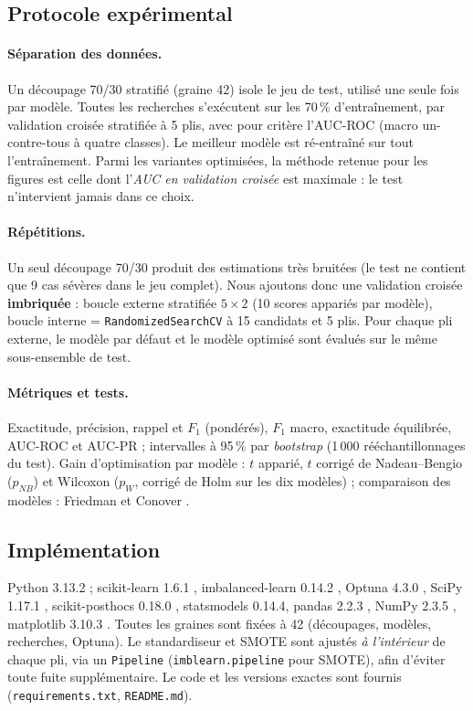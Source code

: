 \subsection{Protocole expérimental}\label{sec:proto}
\paragraph{Séparation des données.} Un découpage 70/30 stratifié (graine 42) isole le jeu de test, utilisé une seule fois par modèle. Toutes les recherches s'exécutent sur les 70\,\% d'entraînement, par validation croisée stratifiée à 5 plis, avec pour critère l'AUC-ROC (macro un-contre-tous à quatre classes). Le meilleur modèle est ré-entraîné sur tout l'entraînement. Parmi les variantes optimisées, la méthode retenue pour les figures est celle dont l'\emph{AUC en validation croisée} est maximale : le test n'intervient jamais dans ce choix.

\paragraph{Répétitions.} Un seul découpage 70/30 produit des estimations très bruitées (le test ne contient que 9 cas sévères dans le jeu complet). Nous ajoutons donc une validation croisée \textbf{imbriquée} : boucle externe stratifiée $5\times2$ (10 scores appariés par modèle), boucle interne = \texttt{RandomizedSearchCV} à 15 candidats et 5 plis. Pour chaque pli externe, le modèle par défaut et le modèle optimisé sont évalués sur le même sous-ensemble de test.

\paragraph{Métriques et tests.} Exactitude, précision, rappel et $F_1$ (pondérés), $F_1$ macro, exactitude équilibrée, AUC-ROC et AUC-PR ; intervalles à 95\,\% par \emph{bootstrap} (1\,000 rééchantillonnages du test). Gain d'optimisation par modèle : $t$ apparié, $t$ corrigé de Nadeau--Bengio ($p_{NB}$) et Wilcoxon ($p_W$, corrigé de Holm sur les dix modèles) ; comparaison des modèles : Friedman et Conover \cite{demsar2006,terpilowski2019}.

\subsection{Implémentation}\label{sec:impl}
Python 3.13.2 ; scikit-learn 1.6.1 \cite{pedregosa2011}, imbalanced-learn 0.14.2 \cite{lemaitre2017}, Optuna 4.3.0 \cite{akiba2019}, SciPy 1.17.1 \cite{virtanen2020}, scikit-posthocs 0.18.0 \cite{terpilowski2019}, statsmodels 0.14.4, pandas 2.2.3 \cite{mckinney2010}, NumPy 2.3.5 \cite{harris2020}, matplotlib 3.10.3 \cite{hunter2007}. Toutes les graines sont fixées à 42 (découpages, modèles, recherches, Optuna). Le standardiseur et SMOTE sont ajustés \emph{à l'intérieur} de chaque pli, via un \texttt{Pipeline} (\texttt{imblearn.pipeline} pour SMOTE), afin d'éviter toute fuite supplémentaire. Le code et les versions exactes sont fournis (\texttt{requirements.txt}, \texttt{README.md}).
